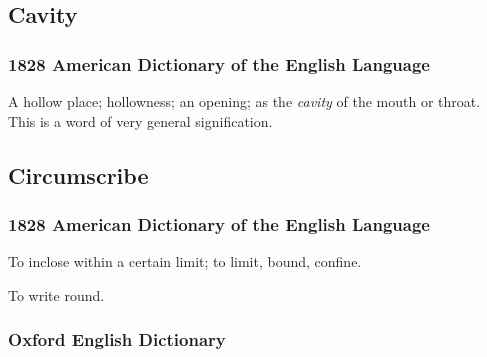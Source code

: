 	\subsection{Cavity} %
		\label{CAVITY}
		
		\subsubsection{1828 American Dictionary of the English Language}

			\begin{compactitem}
				\item A hollow place; hollowness; an opening; as the \textit{cavity} of the mouth or throat. This is a word of very general signification.
			\end{compactitem}
			
	\subsection{Circumscribe} %
		\label{CIRCUMSCRIBE}
		
		
		\subsubsection{1828 American Dictionary of the English Language}
		
			\begin{compactitem}
				\item[1] To inclose within a certain limit; to limit, bound, confine.
				\item[2] To write round.
			\end{compactitem}
			
		\subsubsection{Oxford English Dictionary}
		
